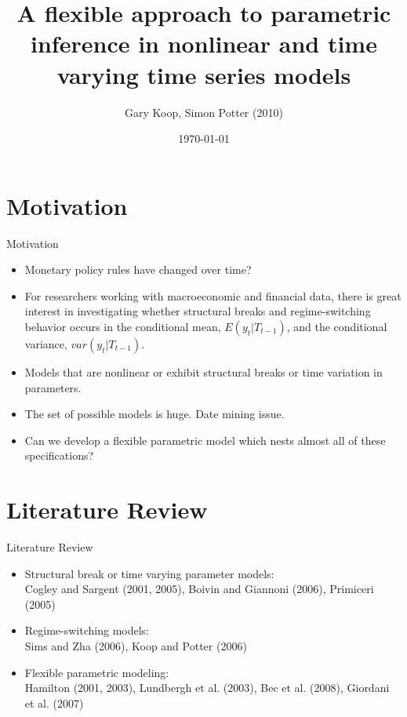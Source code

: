 \documentclass[dvipsnames,mathserif]{beamer}
\begin{document}
\rightskip\rightmargin
\title{A flexible approach to parametric inference in nonlinear and time varying time series models }
\author{Gary Koop, Simon Potter (2010)}


\footnotesize{\date{\today }


\begin{frame}
\maketitle
\end{frame}


%
\footnotesize \tableofcontents
%
\section{Motivation}
\begin{frame}{Motivation}
    \begin{itemize}
        \item Monetary policy rules have changed over time?
        \item For researchers working with macroeconomic and financial data, there is great interest in investigating whether structural breaks and regime-switching behavior occurs in the conditional mean, $E(y_t|T_{t-1})$, and the conditional variance, $var(y_t|T_{t-1})$.
        \item Models that are nonlinear or exhibit structural breaks or time variation in parameters.
        \item The set of possible models is huge. Date mining issue.
        \item Can we develop a flexible parametric model which nests almost all of these specifications?
    \end{itemize}  
\end{frame}


\section{Literature Review}
\begin{frame}{Literature Review}
    \begin{itemize}
        \item Structural break or time varying parameter models:\\
        Cogley and Sargent (2001, 2005), Boivin and Giannoni (2006), Primiceri (2005)
        \item Regime-switching models:\\
        Sims and Zha (2006), Koop and Potter (2006)
        \item Flexible parametric modeling:\\
        Hamilton (2001, 2003), Lundbergh et al. (2003), Bec et al. (2008), Giordani et al. (2007)
    \end{itemize}
\end{frame}

}
\end{document}
